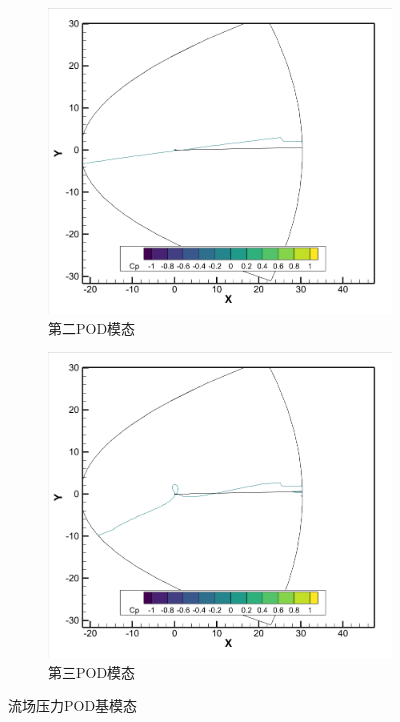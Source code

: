 \begin{figure}[H]
\begin{subfigure}[b]{0.32\textwidth}
        \includegraphics[width=\textwidth]{image/基压力分布图/多变量流场压力基2.png}
        \caption{第二POD模态}
    \end{subfigure}
    \begin{subfigure}[b]{0.32\textwidth}
        \includegraphics[width=\textwidth]{image/基压力分布图/多变量流场压力基3.png}
        \caption{第三POD模态}
    \end{subfigure}
    \caption{\songti 流场压力POD基模态}
    \label{fig:kriging_flow_pod_modes}
\end{figure}

